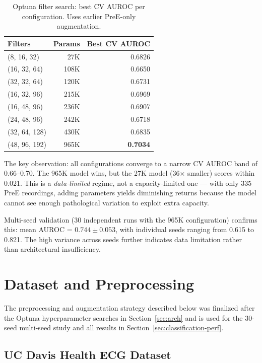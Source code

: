 \documentclass[sigconf,nonacm]{acmart}
\begin{document}
\begin{table}[H]
\centering
\caption{Optuna filter search: best CV AUROC per configuration. Uses earlier PreE-only augmentation.}
\label{tab:filter-search}
\small
\begin{tabular}{lrr}
\toprule
\textbf{Filters} & \textbf{Params} & \textbf{Best CV AUROC} \\
\midrule
(8, 16, 32)    & 27K   & 0.6826 \\
(16, 32, 64)   & 108K  & 0.6650 \\
(32, 32, 64)   & 120K  & 0.6731 \\
(16, 32, 96)   & 215K  & 0.6969 \\
(16, 48, 96)   & 236K  & 0.6907 \\
(24, 48, 96)   & 242K  & 0.6718 \\
(32, 64, 128)  & 430K  & 0.6835 \\
(48, 96, 192)  & 965K  & \textbf{0.7034} \\
\bottomrule
\end{tabular}
\end{table}

The key observation: all configurations converge to a narrow CV AUROC band of 0.66--0.70. The 965K model wins, but the 27K model (36$\times$ smaller) scores within 0.021. This is a \textit{data-limited} regime, not a capacity-limited one --- with only 335 PreE recordings, adding parameters yields diminishing returns because the model cannot see enough pathological variation to exploit extra capacity.

Multi-seed validation (30 independent runs with the 965K configuration) confirms this: mean AUROC = $0.744 \pm 0.053$, with individual seeds ranging from 0.615 to 0.821. The high variance across seeds further indicates data limitation rather than architectural insufficiency.

\section{Dataset and Preprocessing}

The preprocessing and augmentation strategy described below was finalized after the Optuna hyperparameter searches in Section~\ref{sec:arch} and is used for the 30-seed multi-seed study and all results in Section~\ref{sec:classification-perf}.

\subsection{UC Davis Health ECG Dataset}
\end{document}

